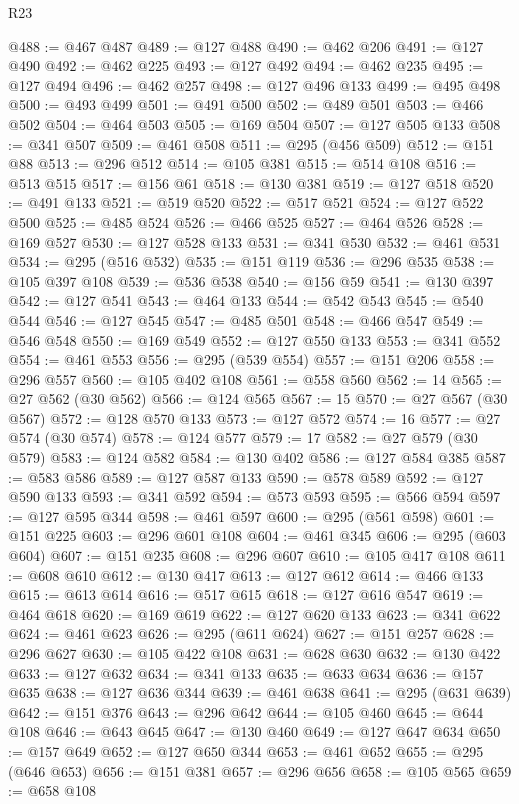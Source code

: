 \begin{lexlean}{R23}
\begin{coremodule}
@488 := @467 @487
@489 := @127 @488
@490 := @462 @206
@491 := @127 @490
@492 := @462 @225
@493 := @127 @492
@494 := @462 @235
@495 := @127 @494
@496 := @462 @257
@498 := @127 @496 @133
@499 := @495 @498
@500 := @493 @499
@501 := @491 @500
@502 := @489 @501
@503 := @466 @502
@504 := @464 @503
@505 := @169 @504
@507 := @127 @505 @133
@508 := @341 @507
@509 := @461 @508
@511 := @295 (@456 @509)
@512 := @151 @88
@513 := @296 @512
@514 := @105 @381
@515 := @514 @108
@516 := @513 @515
@517 := @156 @61
@518 := @130 @381
@519 := @127 @518
@520 := @491 @133
@521 := @519 @520
@522 := @517 @521
@524 := @127 @522 @500
@525 := @485 @524
@526 := @466 @525
@527 := @464 @526
@528 := @169 @527
@530 := @127 @528 @133
@531 := @341 @530
@532 := @461 @531
@534 := @295 (@516 @532)
@535 := @151 @119
@536 := @296 @535
@538 := @105 @397 @108
@539 := @536 @538
@540 := @156 @59
@541 := @130 @397
@542 := @127 @541
@543 := @464 @133
@544 := @542 @543
@545 := @540 @544
@546 := @127 @545
@547 := @485 @501
@548 := @466 @547
@549 := @546 @548
@550 := @169 @549
@552 := @127 @550 @133
@553 := @341 @552
@554 := @461 @553
@556 := @295 (@539 @554)
@557 := @151 @206
@558 := @296 @557
@560 := @105 @402 @108
@561 := @558 @560
@562 := 14
@565 := @27 @562 (@30 @562)
@566 := @124 @565
@567 := 15
@570 := @27 @567 (@30 @567)
@572 := @128 @570 @133
@573 := @127 @572
@574 := 16
@577 := @27 @574 (@30 @574)
@578 := @124 @577
@579 := 17
@582 := @27 @579 (@30 @579)
@583 := @124 @582
@584 := @130 @402
@586 := @127 @584 @385
@587 := @583 @586
@589 := @127 @587 @133
@590 := @578 @589
@592 := @127 @590 @133
@593 := @341 @592
@594 := @573 @593
@595 := @566 @594
@597 := @127 @595 @344
@598 := @461 @597
@600 := @295 (@561 @598)
@601 := @151 @225
@603 := @296 @601 @108
@604 := @461 @345
@606 := @295 (@603 @604)
@607 := @151 @235
@608 := @296 @607
@610 := @105 @417 @108
@611 := @608 @610
@612 := @130 @417
@613 := @127 @612
@614 := @466 @133
@615 := @613 @614
@616 := @517 @615
@618 := @127 @616 @547
@619 := @464 @618
@620 := @169 @619
@622 := @127 @620 @133
@623 := @341 @622
@624 := @461 @623
@626 := @295 (@611 @624)
@627 := @151 @257
@628 := @296 @627
@630 := @105 @422 @108
@631 := @628 @630
@632 := @130 @422
@633 := @127 @632
@634 := @341 @133
@635 := @633 @634
@636 := @157 @635
@638 := @127 @636 @344
@639 := @461 @638
@641 := @295 (@631 @639)
@642 := @151 @376
@643 := @296 @642
@644 := @105 @460
@645 := @644 @108
@646 := @643 @645
@647 := @130 @460
@649 := @127 @647 @634
@650 := @157 @649
@652 := @127 @650 @344
@653 := @461 @652
@655 := @295 (@646 @653)
@656 := @151 @381
@657 := @296 @656
@658 := @105 @565
@659 := @658 @108

\end{coremodule}
\end{lexlean}
